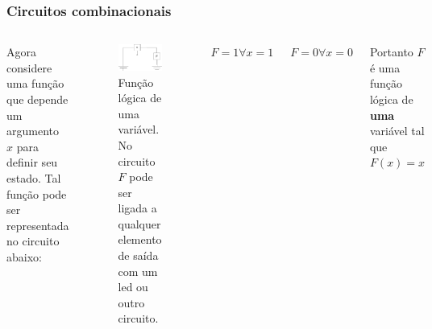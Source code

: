 \begin{frame}
	\frametitle{Circuitos combinacionais}
	\begin{columns}
		\par Agora considere uma função que depende um argumento $x$ para definir seu estado. Tal função pode ser representada no circuito abaixo:
		
		\begin{figure}
			\centering
			\includegraphics[width=0.7\linewidth]{images/funcaoLogica1var}
			\caption{Função lógica de uma variável. No circuito $F$ pode ser ligada a qualquer elemento de saída com um led ou outro circuito.}
			\label{fig:funcaologica1var}
		\end{figure}
		
		\par $F = 1 \forall x=1$
		\par $F = 0 \forall x=0$
		\par Portanto $F$ é uma função lógica de \textbf{uma} variável tal que $F(x)=x$
		
	\end{columns}
\end{frame}


